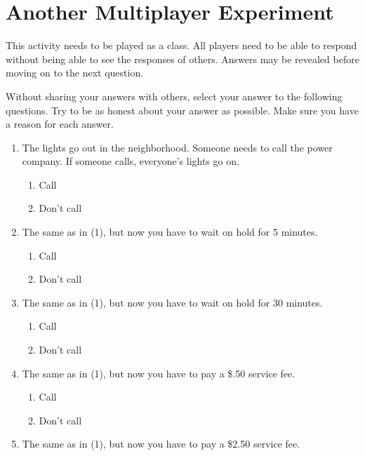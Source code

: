  
\section{Another Multiplayer Experiment}\label{VDexperiment}

This activity needs to be played as a class. All players need to be able to respond without being able to see the responses of others. Answers may be revealed before moving on to the next question.

Without sharing your answers with others, select your answer to the following questions. Try to be as honest about your answer as possible.  Make sure you have a reason for each answer.

\begin{enumerate}
\item The lights go out in the neighborhood. Someone needs to call the power company. If someone calls, everyone's lights go on.

\begin{enumerate}
\item Call
\item Don't call
\end{enumerate}

\item The same as in (1), but now you have to wait on hold for 5 minutes.

\begin{enumerate}
\item Call
\item Don't call
\end{enumerate}

\item The same as in (1), but now you have to wait on hold for 30 minutes.

\begin{enumerate}
\item Call
\item Don't call
\end{enumerate}

\item The same as in (1), but now you have to pay a \$.50 service fee.

\begin{enumerate}
\item Call
\item Don't call
\end{enumerate}

\item The same as in (1), but now you have to pay a \$2.50 service fee.


\end{enumerate}
